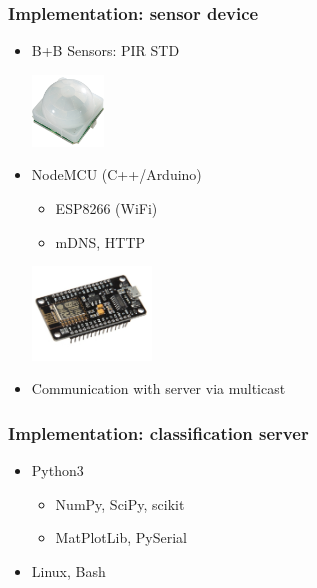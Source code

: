 \documentclass[10pt,xcolor=pdflatex]{beamer}
\begin{document}
\begin{frame}\frametitle{Implementation: sensor device}
    \begin{itemize}
        \item B+B Sensors: PIR STD
            \begin{center}
                \includegraphics[width=0.15\textwidth]{img/pirstd.png}
            \end{center}
        \item NodeMCU (C++/Arduino)
            \begin{itemize}
                \item ESP8266 (WiFi)
                \item mDNS, HTTP
            \end{itemize}
            \begin{center}
                \includegraphics[width=0.25\textwidth]{img/nodemcu.png}
            \end{center}
        \item Communication with server via multicast
    \end{itemize} 
\end{frame} 

\begin{frame}\frametitle{Implementation: classification server}
    \begin{itemize}
        \item Python3
            \begin{itemize}
                \item NumPy, SciPy, scikit
                \item MatPlotLib, PySerial
            \end{itemize}
        \item Linux, Bash
    \end{itemize}
\end{frame}
\end{document}
